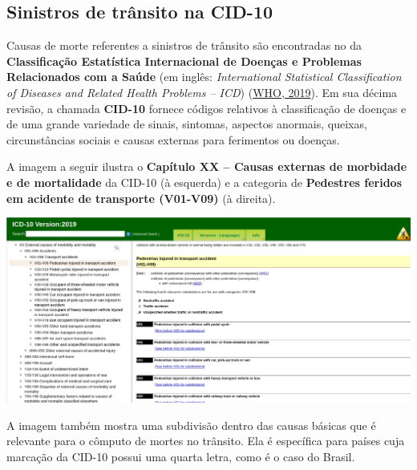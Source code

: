 \documentclass[
]{article}
\begin{document}
\subsection{}\label{section}

\subsection{Sinistros de trânsito na
CID-10}\label{sinistros-de-truxe2nsito-na-cid-10}

Causas de morte referentes a sinistros de trânsito são encontradas no da
\textbf{Classificação Estatística Internacional de Doenças e Problemas
Relacionados com a Saúde} (em inglês: \emph{International Statistical
Classification of Diseases and Related Health Problems -- ICD})
(\href{https://icd.who.int/browse10/2019/en\#/XX}{WHO, 2019}). Em sua
décima revisão, a chamada \textbf{CID-10} fornece códigos relativos à
classificação de doenças e de uma grande variedade de sinais, sintomas,
aspectos anormais, queixas, circunstâncias sociais e causas externas
para ferimentos ou doenças.

A imagem a seguir ilustra o \textbf{Capítulo XX -- Causas externas de
morbidade e de mortalidade} da CID-10 (à esquerda) e a categoria de
\textbf{Pedestres feridos em acidente de transporte (V01-V09)} (à
direita).

\href{https://icd.who.int/browse10/2019/en#/V01-V09}{\includegraphics[width=22.22in]{../imgs/ICD-10} }

A imagem também mostra uma subdivisão dentro das causas básicas que é
relevante para o cômputo de mortes no trânsito. Ela é específica para
países cuja marcação da CID-10 possui uma quarta letra, como é o caso do
Brasil.
\end{document}
